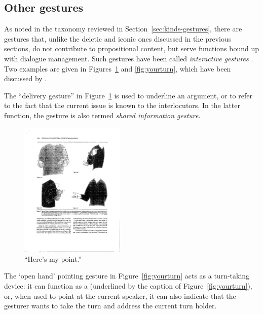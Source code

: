 \documentclass[output=paper]{langsci/langscibook}
\begin{document}
\subsection{Other gestures}
\label{sec:other-gestures}

As noted in the taxonomy reviewed in Section~\ref{sec:kinds-gestures}, there are gestures that, unlike the deictic and iconic ones discussed in the previous sections, do not contribute to propositional content, but serve functions bound up with dialogue management.
%
Such gestures have been called \emph{interactive gestures} \citep{Bavelas:Chovil:Lawrie:Wade:1992}.
%
Two examples are given in Figures~\ref{fig:mypoint} and \ref{fig:yourturn}, which have been discussed by \citet{Bavelas:Chovil:Coates:Roe:1995}.


The \enquote{delivery gesture}  in Figure~\ref{fig:mypoint} is used to underline an argument, or to refer to the fact that the current issue is known to the interlocutors. 
%
In the latter function, the gesture is also termed \emph{shared information gesture}.

\begin{figure}
  \centering
  \includegraphics[trim={18cm 12cm 6cm 3cm}, clip, angle=90, width=5cm]{figures/InteractiveGestures}
\caption{\enquote{Here's my point.}}
\label{fig:mypoint}
\end{figure}


The \enquote*{open hand} pointing gesture in Figure~\ref{fig:yourturn} acts as a turn-taking device: it can function as a  (underlined by the caption of Figure~\ref{fig:yourturn}), or, when used to point at the current speaker, it can also indicate that the gesturer wants to take the turn and address the current turn holder.
\end{document}
